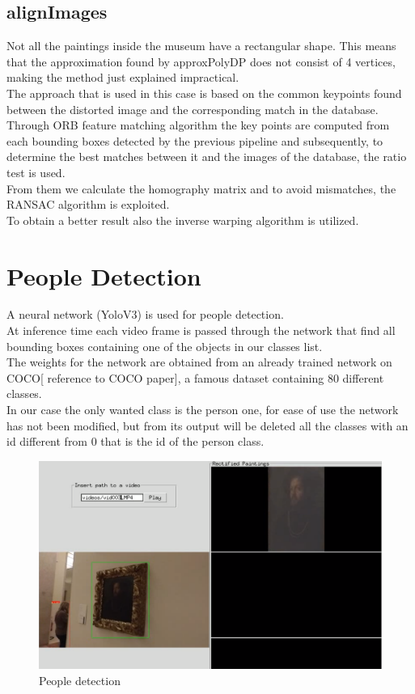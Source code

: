 \documentclass[conference]{IEEEtran}
\begin{document}
\subsection{alignImages}
Not all the paintings inside the museum have a rectangular shape. This means that the approximation found by approxPolyDP does not consist of 4 vertices, making the method just explained impractical.\\
The approach that is used in this case is based on the common keypoints found between the distorted image and the corresponding match in the database.\\
Through ORB feature matching algorithm the key points are computed from each bounding boxes detected by the previous pipeline and subsequently, to determine the best matches between it and the images of the database, the ratio test is used.\\
From them we calculate the homography matrix and
to avoid mismatches, the RANSAC algorithm is exploited.\\
To obtain a better result also the inverse warping algorithm is utilized.

\section{People Detection}
A neural network (YoloV3) is used for people detection.\\
At inference time each video frame is passed through the network that find all bounding boxes containing one of the objects in our classes list.\\
The weights for the network are obtained from an already trained network on COCO[ reference to COCO paper], a famous dataset containing 80 different classes.\\
In our case the only wanted class is the person one, for ease of use the network has not been modified, but from its output will be deleted all the classes with an id different from 0 that is the id of the person class.\\

\begin{figure}[htbp]
\centerline{\includegraphics[width=0.8\columnwidth]{../people_detection/paint_and_person.png}}
\caption{People detection}
\label{fig_People_detection}
\end{figure}
\end{document}
